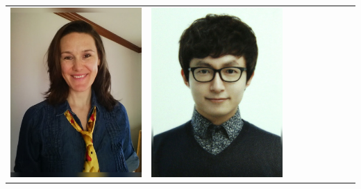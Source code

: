 \documentclass[landscape,a0paper,fontscale=0.292]{baposter}
\begin{document}
\begin{poster}
{\begin{center}
\begin{tabularx}{\linewidth}{X X X X X X X X X}
{\centering \includegraphics[width=0.65\linewidth]{bowser.jpg}}&
{\centering \includegraphics[width=0.65\linewidth]{choi.jpg}}&

\end{tabularx}
\end{center}}
\end{poster}
\end{document}
